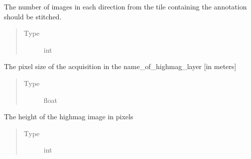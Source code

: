 \documentclass[letterpaper,10pt,english]{sphinxmanual}
\begin{document}
\begin{fulllineitems}
\begin{fulllineitems}
\begin{quote}
\begin{description}
\end{description}\end{quote}

\end{fulllineitems}


\begin{fulllineitems}
\label{\detokenize{index:sites_of_interest_parser.MapsXmlParser.stitch_radius}}
The number of images in each direction from the tile containing the annotation should be
stitched.
\begin{quote}\begin{description}
\item[{Type}] \leavevmode
int

\end{description}\end{quote}

\end{fulllineitems}


\begin{fulllineitems}
\label{\detokenize{index:sites_of_interest_parser.MapsXmlParser.pixel_size}}
The pixel size of the acquisition in the name\_of\_highmag\_layer {[}in meters{]}
\begin{quote}\begin{description}
\item[{Type}] \leavevmode
float

\end{description}\end{quote}

\end{fulllineitems}


\begin{fulllineitems}
\label{\detokenize{index:sites_of_interest_parser.MapsXmlParser.img_height}}
The height of the highmag image in pixels
\begin{quote}\begin{description}
\item[{Type}] \leavevmode
int


\end{description}
\end{quote}
\end{fulllineitems}
\end{fulllineitems}
\end{document}
